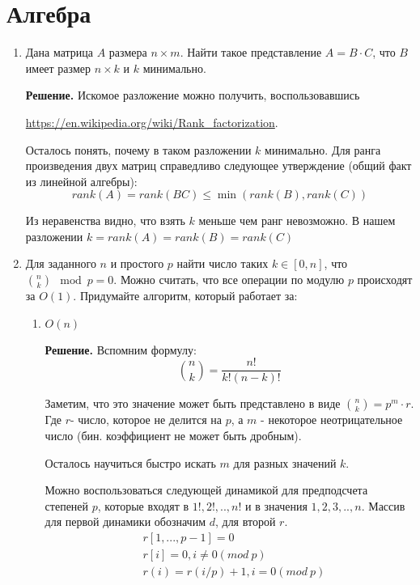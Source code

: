 \section{Алгебра}
\begin{enumerate}
	\item Дана матрица $A$ размера $n \times m$. Найти такое представление $A = B \cdot C$, что $B$ имеет размер 
	$n\times k$ и $k$ минимально.
	
	\textbf{Решение.} Искомое разложение можно получить, воспользовавшись
	
	\url{https://en.wikipedia.org/wiki/Rank_factorization}.
	 
	Осталось понять, почему в таком разложении $k$ минимально. Для ранга произведения двух матриц справедливо 
	следующее утверждение (общий факт из линейной алгебры):
	\begin{equation*}
		rank(A) = rank(BC) \leqslant \min(rank(B), rank(C))
	\end{equation*}
	 
	Из неравенства видно, что взять $k$ меньше чем ранг невозможно. В нашем разложении $k = rank(A) = rank(B) = 
	rank(C)$
	
	\item Для заданного $n$ и простого $p$ найти число таких $k \in [0, n]$, что $\binom{n}{k} \mod p = 0$. Можно 
	считать, что все операции по модулю $p$ происходят за $O(1)$. Придумайте алгоритм, который работает за:
	\begin{enumerate}
		\item $O(n)$
		
		\textbf{Решение.} Вспомним формулу:
		\begin{equation*}
		\binom{n}{k} = \frac{n!}{k!(n - k)!}
		\end{equation*}
		
		Заметим, что это значение может быть представлено в виде $\binom{n}{k} = p^m \cdot r$. Где $r$- число, 
		которое не делится на $p$, а $m$ - некоторое неотрицательное число (бин. коэффициент не может быть 
		дробным).
		
		Осталось научиться быстро искать $m$ для разных значений $k$.
		
		Можно воспользоваться следующей динамикой для предподсчета степеней $p$, которые входят в $1!, 2!, .., 
		n!$ и в значения $1,2,3, .., n$. Массив для первой динамики обозначим $d$, для второй $r$.
		\begin{align*}
			&r[1, ..., p - 1] = 0 \\
			&r[i] = 0, i \neq 0 (mod \ p) \\
			&r(i) = r(i / p) + 1, i = 0(mod \ p)
		\end{align*}
		

\end{enumerate}
\end{enumerate}
